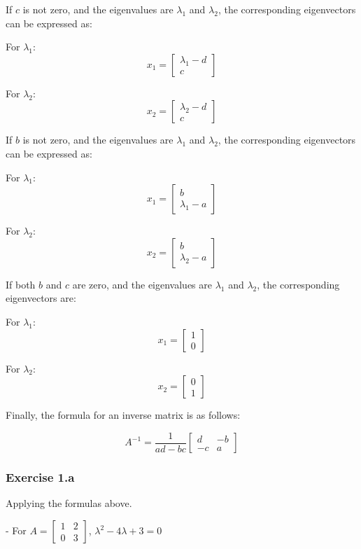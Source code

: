 \documentclass{article}
\begin{document}
If \(c\) is not zero, and the eigenvalues are \(\lambda_1\) and \(\lambda_2\), the corresponding eigenvectors can be expressed as:

For \(\lambda_1\):
\[
    x_1 = \begin{bmatrix} \lambda_1 - d \\ c \end{bmatrix}
\]

For \(\lambda_2\):
\[
    x_2 = \begin{bmatrix} \lambda_2 - d \\ c \end{bmatrix}
\]

If \( b \) is not zero, and the eigenvalues are \( \lambda_1 \) and \( \lambda_2 \), the corresponding eigenvectors can be expressed as:

For \( \lambda_1 \):
\[
    x_1 = \begin{bmatrix} b \\ \lambda_1 - a \end{bmatrix}
\]

For \( \lambda_2 \):
\[
    x_2 = \begin{bmatrix} b \\ \lambda_2 - a \end{bmatrix}
\]

If both \( b \) and \( c \) are zero, and the eigenvalues are \( \lambda_1 \) and \( \lambda_2 \), the corresponding eigenvectors are:

For \( \lambda_1 \):
\[
    x_1 = \begin{bmatrix} 1 \\ 0 \end{bmatrix}
\]

For \( \lambda_2 \):
\[
    x_2 = \begin{bmatrix} 0 \\ 1 \end{bmatrix}
\]

Finally, the formula for an inverse matrix is as follows:

\[
    A^{-1} = \frac{1}{ad - bc} \begin{bmatrix} d & -b \\ -c & a \end{bmatrix}
\]

\subsubsection{Exercise 1.a}
Applying the formulas above.

- For \( A = \begin{bmatrix} 1 & 2 \\ 0 & 3 \end{bmatrix} \), \( \lambda^2 - 4\lambda + 3 = 0 \)
\end{document}
